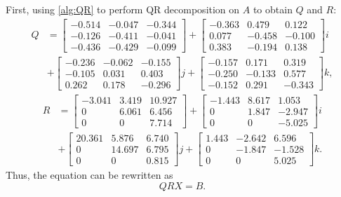 \documentclass[conference]{IEEEtran}
\numberwithin{equation}{section}
\begin{document}
First, using \cref{alg:QR} to perform QR decomposition on $A$ to obtain $Q$ and $R:$
\setlength{\jot}{2pt}
\setlength{\arraycolsep}{1pt}
\begin{align*}
  Q &=
     \begin{bmatrix}
    -0.514 & -0.047 & -0.344 \\
    -0.126 & -0.411 & -0.041 \\
    -0.436 & -0.429 & -0.099
    \end{bmatrix} +
    \begin{bmatrix}
    -0.363 &  0.479 &  0.122 \\
     0.077 & -0.458 & -0.100 \\
     0.383 & -0.194 &  0.138
    \end{bmatrix} i\\
    &+ 
    \begin{bmatrix}
    -0.236 & -0.062 & -0.155 \\
    -0.105 &  0.031 &  0.403 \\
     0.262 &  0.178 & -0.296
    \end{bmatrix} j +
    \begin{bmatrix}
    -0.157 &  0.171 &  0.319 \\
    -0.250 & -0.133 &  0.577 \\
    -0.152 &  0.291 & -0.343
    \end{bmatrix} k,
    \end{align*}
    \begin{align*}
  R &=
    \begin{bmatrix}
    -3.041 & 3.419 & 10.927 \\
     0     & 6.061 & 6.456 \\
     0     & 0     & 7.714
    \end{bmatrix} +
    \begin{bmatrix}
    -1.443 & 8.617 &  1.053 \\
     0     & 1.847 & -2.947 \\
     0     & 0     & -5.025
    \end{bmatrix} i\\
    &+ 
    \begin{bmatrix}
    20.361 & 5.876  & 6.740 \\
     0     & 14.697 & 6.795 \\
     0     & 0      & 0.815
    \end{bmatrix} j +
    \begin{bmatrix}
    1.443 & -2.642 &  6.596 \\
    0     & -1.847 & -1.528 \\
    0     &  0     &  5.025
    \end{bmatrix} k.
\end{align*}
Thus, the equation can be rewritten as
\begin{equation}
    QRX = B.\label{eq:example1}
\end{equation}
\end{document}
